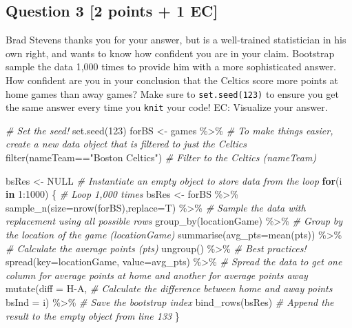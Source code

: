 \documentclass[
]{article}
\newenvironment{Shaded}{\begin{snugshade}}{\end{snugshade}}
\newcommand{\AttributeTok}[1]{\textcolor[rgb]{0.77,0.63,0.00}{#1}}
\newcommand{\CommentTok}[1]{\textcolor[rgb]{0.56,0.35,0.01}{\textit{#1}}}
\newcommand{\ConstantTok}[1]{\textcolor[rgb]{0.00,0.00,0.00}{#1}}
\newcommand{\ControlFlowTok}[1]{\textcolor[rgb]{0.13,0.29,0.53}{\textbf{#1}}}
\newcommand{\DecValTok}[1]{\textcolor[rgb]{0.00,0.00,0.81}{#1}}
\newcommand{\FunctionTok}[1]{\textcolor[rgb]{0.00,0.00,0.00}{#1}}
\newcommand{\NormalTok}[1]{#1}
\newcommand{\OtherTok}[1]{\textcolor[rgb]{0.56,0.35,0.01}{#1}}
\newcommand{\SpecialCharTok}[1]{\textcolor[rgb]{0.00,0.00,0.00}{#1}}
\newcommand{\StringTok}[1]{\textcolor[rgb]{0.31,0.60,0.02}{#1}}
\begin{document}
\hypertarget{question-3-2-points-1-ec}{%
\subsection{Question 3 {[}2 points + 1
EC{]}}\label{question-3-2-points-1-ec}}

Brad Stevens thanks you for your answer, but is a well-trained
statistician in his own right, and wants to know how confident you are
in your claim. Bootstrap sample the data 1,000 times to provide him with
a more sophisticated answer. How confident are you in your conclusion
that the Celtics score more points at home games than away games? Make
sure to \texttt{set.seed(123)} to ensure you get the same answer every
time you \texttt{knit} your code! EC: Visualize your answer.

\begin{Shaded}
\begin{Highlighting}[]
\CommentTok{\# Set the seed!}
\FunctionTok{set.seed}\NormalTok{(}\DecValTok{123}\NormalTok{)}
\NormalTok{forBS }\OtherTok{\textless{}{-}}\NormalTok{ games }\SpecialCharTok{\%\textgreater{}\%} \CommentTok{\# To make things easier, create a new data object that is filtered to just the Celtics}
    \FunctionTok{filter}\NormalTok{(nameTeam}\SpecialCharTok{==}\StringTok{"Boston Celtics"}\NormalTok{) }\CommentTok{\# Filter to the Celtics (nameTeam)}

\NormalTok{bsRes }\OtherTok{\textless{}{-}} \ConstantTok{NULL} \CommentTok{\# Instantiate an empty object to store data from the loop}
\ControlFlowTok{for}\NormalTok{(i }\ControlFlowTok{in} \DecValTok{1}\SpecialCharTok{:}\DecValTok{1000}\NormalTok{) \{ }\CommentTok{\# Loop 1,000 times}
\NormalTok{  bsRes }\OtherTok{\textless{}{-}}\NormalTok{ forBS }\SpecialCharTok{\%\textgreater{}\%}
    \FunctionTok{sample\_n}\NormalTok{(}\AttributeTok{size=}\FunctionTok{nrow}\NormalTok{(forBS),}\AttributeTok{replace=}\NormalTok{T) }\SpecialCharTok{\%\textgreater{}\%} \CommentTok{\# Sample the data with replacement using all possible rows}
    \FunctionTok{group\_by}\NormalTok{(locationGame) }\SpecialCharTok{\%\textgreater{}\%} \CommentTok{\# Group by the location of the game (locationGame)}
    \FunctionTok{summarise}\NormalTok{(}\AttributeTok{avg\_pts=}\FunctionTok{mean}\NormalTok{(pts)) }\SpecialCharTok{\%\textgreater{}\%} \CommentTok{\# Calculate the average points (pts)}
    \FunctionTok{ungroup}\NormalTok{() }\SpecialCharTok{\%\textgreater{}\%} \CommentTok{\# Best practices!}
    \FunctionTok{spread}\NormalTok{(}\AttributeTok{key=}\NormalTok{locationGame, }\AttributeTok{value=}\NormalTok{avg\_pts) }\SpecialCharTok{\%\textgreater{}\%} \CommentTok{\# Spread the data to get one column for average points at home and another for average points away}
    \FunctionTok{mutate}\NormalTok{(}\AttributeTok{diff =}\NormalTok{ H}\SpecialCharTok{{-}}\NormalTok{A, }\CommentTok{\# Calculate the difference between home and away points}
           \AttributeTok{bsInd =}\NormalTok{ i) }\SpecialCharTok{\%\textgreater{}\%} \CommentTok{\# Save the bootstrap index}
    \FunctionTok{bind\_rows}\NormalTok{(bsRes) }\CommentTok{\# Append the result to the empty object from line 133}
\NormalTok{\} }


\end{Highlighting}
\end{Shaded}
\end{document}
